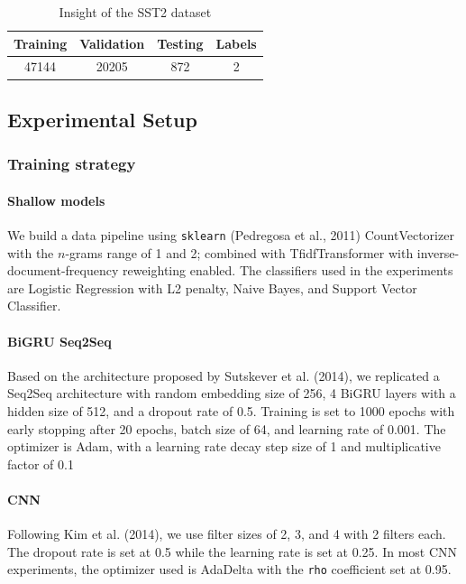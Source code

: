 \documentclass[sn-mathphys,Numbered]{sn-jnl}%
\theoremstyle{thmstyleone}%
\theoremstyle{thmstyletwo}%
\theoremstyle{thmstylethree}%
\begin{document}
\begin{table}[htp]
\centering
\caption{Insight of the SST2 dataset} \label{tab:sst2-insight}
\begin{tabular*}{\textwidth}{@{\extracolsep\fill}cccc}
\toprule
\textbf{Training} & \textbf{Validation} & \textbf{Testing} & \textbf{Labels} \\ \midrule
47144              & 20205              & 872                      & 2 \\ \bottomrule
\end{tabular*}
\end{table}


\subsection{Experimental Setup}
\subsubsection{Training strategy}
\paragraph{Shallow models}
We build a data pipeline using \texttt{sklearn} (Pedregosa et al., 2011)\cite{Pedregosa2011} CountVectorizer with the $n$-grams range of 1 and 2; combined with TfidfTransformer with inverse-document-frequency reweighting enabled. The classifiers used in the experiments are Logistic Regression with L2 penalty, Naive Bayes, and Support Vector Classifier.

\paragraph{BiGRU Seq2Seq} 
Based on the architecture proposed by Sutskever et al. (2014), we replicated a Seq2Seq architecture with random embedding size of 256, 4 BiGRU layers with a hidden size of 512, and a dropout rate of 0.5. Training is set to 1000 epochs with early stopping after 20 epochs, batch size of 64, and learning rate of 0.001. The optimizer is Adam, with a learning rate decay step size of 1 and multiplicative factor of 0.1

\paragraph{CNN} 
Following Kim et al. (2014), we use filter sizes of 2, 3, and 4 with 2 filters each. The dropout rate is set at 0.5 while the learning rate is set at 0.25. In most CNN experiments, the optimizer used is AdaDelta with the \texttt{rho} coefficient set at 0.95. 
\end{document}
